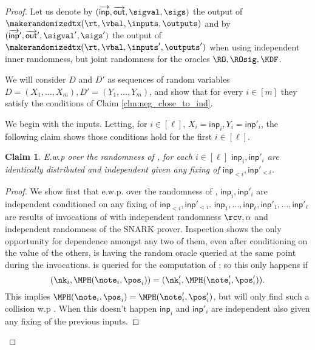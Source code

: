 \documentclass[11pt]{article}
\numberwithin{equation}{section} %
\numberwithin{figure}{section} %
\newtheorem{claim}[thm]{Claim}
\newcommand{\inp}{\ensuremath{\mathsf{inp}}\xspace}
\newcommand{\inps}{\ensuremath{\overrightarrow{\mathsf{inp}}}\xspace}
\newcommand{\outs}{\ensuremath{\overrightarrow{\mathsf{out}}}\xspace}
\begin{document}
\begin{proof}
Let us denote by $(\inps,\outs,\sigval,\sigs)$ the output of $\makerandomizedtx(\rt,\vbal,\inputs,\outputs)$
and by $(\inps',\outs',\sigval',\sigs')$ the output of $\makerandomizedtx(\rt,\vbal,\inputs',\outputs')$
when using independent inner randomness, but joint randomness for the oracles $\RO,\ROsig,\KDF$.

We will consider $D$ and $D'$ as sequences of random variables $D=(X_1,\ldots,X_m), D'= (Y_1,\ldots,Y_m)$,
and show that for every $i\in [m]$ they satisfy the conditions of Claim \ref{clm:neg_close_to_ind}.

We begin with the inputs. Letting, for $i\in [\ell]$, $X_i = \inp_i, Y_i = \inp'_i$, the following claim shows
those conditions hold for the first $i\in [\ell]$.
% 

\begin{claim}\label{clm:inps-areind}
E.w.p \negl over the randomness of \adv, for each $i\in [\ell]$ $\inp_{i},\inp'_{i}$ are identically distributed and independent given any fixing of $\inp_{<i},\inp'_{<i}$. 

\end{claim}																	
\begin{proof}
We show first that e.w.p. \negl over the randomness of \adv, $\inp_i,\inp'_i$ are independent conditioned on any fixing of $\inp_{<i},\inp'_{<i}$.
$\inp_1,\ldots,\inp_\ell,\inp'_1,\ldots,\inp'_\ell$
are results of invocations of \makeinput with independent randomness
$\rcv,\alpha$ and independent randomness of the SNARK prover.
Inspection shows the only opportunity for dependence amongst any two of them, even after conditioning on the value of the others, is having 
the random oracle \RO queried at the same point during the invocations.
\RO is queried for the computation of \NF; so this only happens if %
 \[(\nk_i,\MPH(\note_i,\pos_i)) =(\nk'_i,\MPH(\note'_i,\pos'_i)).\]
This implies $\MPH(\note_i,\pos_i) = \MPH(\note'_i,\pos'_i)$,
but \adv will only find such a collision w.p \negl.
When this doesn't happen $\inp_i$ and $\inp'_i$ are independent also given any fixing of the previous inputs.



\end{proof}
\end{proof}
\end{document}
